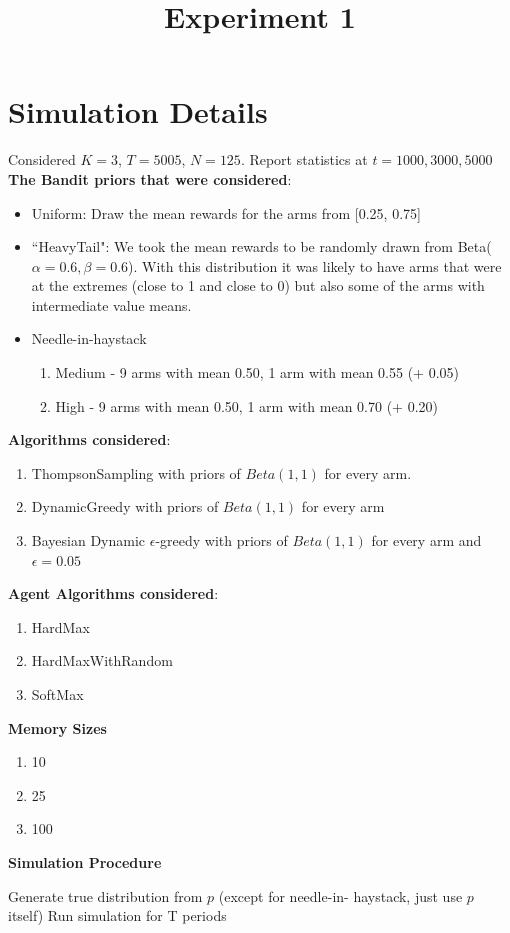 \documentclass[11pt,letterpaper]{article}
\begin{document}
 

\title{Experiment 1}
\maketitle

\section*{Simulation Details}

Considered $K = 3$, $T = 5005$, $N = 125$. Report statistics at $t = 1000, 3000, 5000$ \\
\textbf{The Bandit priors that were considered}:
\begin{itemize}
\item Uniform: Draw the mean rewards for the arms from [0.25, 0.75]
\item ``HeavyTail": We took the mean rewards to be randomly drawn from Beta($\alpha=0.6,\beta=0.6$). With this distribution it was likely to have arms that were at the extremes (close to 1 and close to 0) but also some of the arms with intermediate value means.
\item Needle-in-haystack
\begin{enumerate}
\item Medium - 9 arms with mean 0.50, 1 arm with mean 0.55 (+ 0.05)
\item High - 9 arms with mean 0.50, 1 arm with mean 0.70 (+ 0.20)
\end{enumerate}
\end{itemize}
\textbf{Algorithms considered}:
\begin{enumerate}
\item ThompsonSampling with priors of $Beta(1, 1)$ for every arm.
\item DynamicGreedy with priors of $Beta(1, 1)$ for every arm
\item Bayesian Dynamic $\epsilon$-greedy with priors of $Beta(1, 1)$ for every arm and $\epsilon=0.05$
\end{enumerate}
\textbf{Agent Algorithms considered}:
\begin{enumerate}
\item HardMax
\item HardMaxWithRandom
\item SoftMax
\end{enumerate}
\textbf{Memory Sizes}
\begin{enumerate}
\item 10
\item 25
\item 100
\end{enumerate}
\pagebreak
\textbf{Simulation Procedure}
\begin{algorithm}
\begin{algorithmic}[1]
				\State Generate true distribution from $p$ (except for needle-in-		haystack, just use $p$ itself)
				\State Run simulation for T periods
			\EndFor
		\EndFor
	\EndFor
\EndFor
\end{algorithmic}
\end{algorithm}
\end{document}
